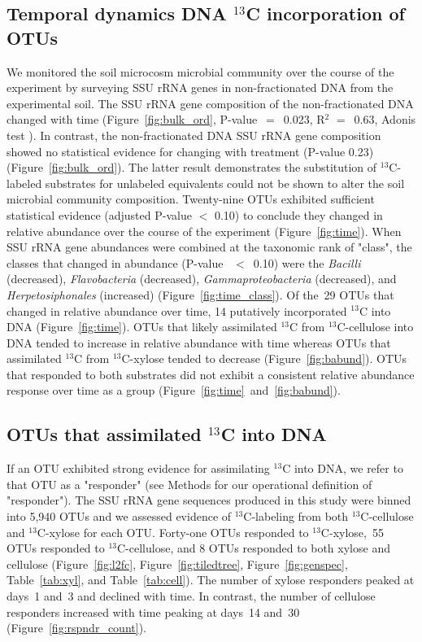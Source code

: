 \subsection{Temporal dynamics DNA $^{13}$C incorporation of OTUs}
We monitored the soil microcosm microbial community over the course of the
experiment by surveying SSU rRNA genes in non-fractionated DNA from the
experimental soil. The SSU rRNA gene composition of the non-fractionated DNA
changed with time (Figure~\ref{fig:bulk_ord}, P-value~$=$~0.023, R$^{2}$
$=$~0.63, Adonis test \citep{Anderson2001a}). In contrast, the non-fractionated
DNA SSU rRNA gene composition showed no statistical evidence for changing with
treatment (P-value 0.23) (Figure~\ref{fig:bulk_ord}). The latter result
demonstrates the substitution of $^{13}$C-labeled substrates for unlabeled
equivalents could not be shown to alter the soil microbial community
composition. Twenty-nine OTUs exhibited sufficient statistical evidence
(adjusted P-value $<$ 0.10) to conclude they changed in relative abundance over
the course of the experiment (Figure~\ref{fig:time}). When SSU rRNA gene
abundances were combined at the taxonomic rank of "class", the classes that
changed in abundance (P-value~ $<$~0.10) were the \textit{Bacilli} (decreased),
\textit{Flavobacteria} (decreased), \textit{Gammaproteobacteria} (decreased),
and \textit{Herpetosiphonales} (increased) (Figure~\ref{fig:time_class}). Of
the~29 OTUs that changed in relative abundance over time, 14 putatively
incorporated $^{13}$C into DNA (Figure~\ref{fig:time}). OTUs that likely
assimilated $^{13}$C from $^{13}$C-cellulose into DNA tended to increase in
relative abundance with time whereas OTUs that assimilated $^{13}$C from
$^{13}$C-xylose tended to decrease (Figure~\ref{fig:babund}). OTUs that
responded to both substrates did not exhibit a consistent relative abundance
response over time as a group (Figure~\ref{fig:time}~and~\ref{fig:babund}).

\subsection{OTUs that assimilated $^{13}$C into DNA} \label{responders}
If an OTU exhibited strong evidence for assimilating $^{13}$C into DNA, we
refer to that OTU as a "responder" (see Methods for our
operational definition of "responder"). The SSU rRNA gene sequences produced in
this study were binned into 5,940 OTUs and we assessed evidence of
$^{13}$C-labeling from both $^{13}$C-cellulose and
$^{13}$C-xylose for each OTU. Forty-one OTUs responded to $^{13}$C-xylose,~55
OTUs responded to $^{13}$C-cellulose, and 8 OTUs responded to both xylose and
cellulose (Figure~\ref{fig:l2fc}, Figure~\ref{fig:tiledtree},
Figure~\ref{fig:genspec}, Table~\ref{tab:xyl}, and Table~\ref{tab:cell}). The
number of xylose responders peaked at days~1 and~3 and declined with time. In
contrast, the number of cellulose responders increased with time peaking at
days~14 and~30 (Figure~\ref{fig:rspndr_count}). 

